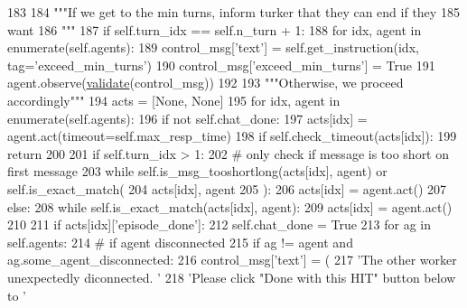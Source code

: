 \begin{DoxyCode}
183 
184         \textcolor{stringliteral}{"""If we get to the min turns, inform turker that they can end if they}
185 \textcolor{stringliteral}{           want}
186 \textcolor{stringliteral}{        """}
187         \textcolor{keywordflow}{if} self.turn\_idx == self.n\_turn + 1:
188             \textcolor{keywordflow}{for} idx, agent \textcolor{keywordflow}{in} enumerate(self.agents):
189                 control\_msg[\textcolor{stringliteral}{'text'}] = self.get\_instruction(idx, tag=\textcolor{stringliteral}{'exceed\_min\_turns'})
190                 control\_msg[\textcolor{stringliteral}{'exceed\_min\_turns'}] = \textcolor{keyword}{True}
191                 agent.observe(\hyperlink{namespaceparlai_1_1core_1_1worlds_afc3fad603b7bce41dbdc9cdc04a9c794}{validate}(control\_msg))
192 
193         \textcolor{stringliteral}{"""Otherwise, we proceed accordingly"""}
194         acts = [\textcolor{keywordtype}{None}, \textcolor{keywordtype}{None}]
195         \textcolor{keywordflow}{for} idx, agent \textcolor{keywordflow}{in} enumerate(self.agents):
196             \textcolor{keywordflow}{if} \textcolor{keywordflow}{not} self.chat\_done:
197                 acts[idx] = agent.act(timeout=self.max\_resp\_time)
198             \textcolor{keywordflow}{if} self.check\_timeout(acts[idx]):
199                 \textcolor{keywordflow}{return}
200 
201             \textcolor{keywordflow}{if} self.turn\_idx > 1:
202                 \textcolor{comment}{# only check if message is too short on first message}
203                 \textcolor{keywordflow}{while} self.is\_msg\_tooshortlong(acts[idx], agent) \textcolor{keywordflow}{or} self.is\_exact\_match(
204                     acts[idx], agent
205                 ):
206                     acts[idx] = agent.act()
207             \textcolor{keywordflow}{else}:
208                 \textcolor{keywordflow}{while} self.is\_exact\_match(acts[idx], agent):
209                     acts[idx] = agent.act()
210 
211             \textcolor{keywordflow}{if} acts[idx][\textcolor{stringliteral}{'episode\_done'}]:
212                 self.chat\_done = \textcolor{keyword}{True}
213                 \textcolor{keywordflow}{for} ag \textcolor{keywordflow}{in} self.agents:
214                     \textcolor{comment}{# if agent disconnected}
215                     \textcolor{keywordflow}{if} ag != agent \textcolor{keywordflow}{and} ag.some\_agent\_disconnected:
216                         control\_msg[\textcolor{stringliteral}{'text'}] = (
217                             \textcolor{stringliteral}{'The other worker unexpectedly diconnected. '}
218                             \textcolor{stringliteral}{'Please click "Done with this HIT" button below to '}

\end{DoxyCode}
